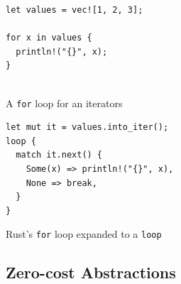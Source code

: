 
\begin{listing}[!h]
 \begin{minipage}{0.45\textwidth}
\begin{listing}[H]
  \begin{verbatim}
let values = vec![1, 2, 3];

for x in values {
  println!("{}", x);
}


\end{verbatim}
\caption{A \texttt{for} loop for an iterators}
\label{lst:rust:for}
\end{listing}
 \end{minipage}
 \begin{minipage}{0.45\textwidth}
  \begin{listing}[H]
    \begin{verbatim}
let mut it = values.into_iter();
loop {
  match it.next() {
    Some(x) => println!("{}", x),
    None => break,
  }
}
    \end{verbatim}
    \caption{Rust's \texttt{for} loop expanded to a \texttt{loop}}
    \label{lst:rust:desugared-for}
  \end{listing}
 \end{minipage}
\end{listing}




\subsection{Zero-cost Abstractions}
\label{chap:zero_cost_abstractions}

